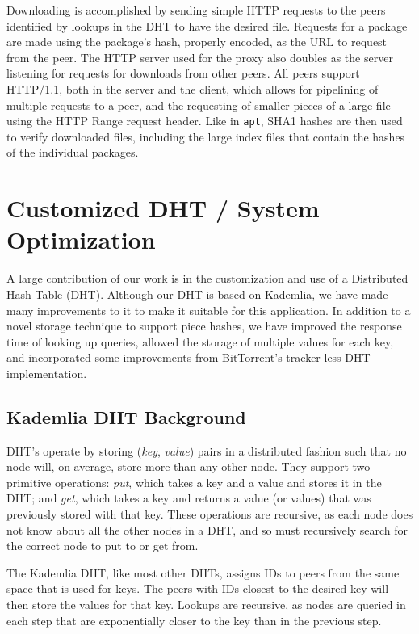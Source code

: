 \documentclass[conference]{IEEEtran}
\begin{document}
Downloading is accomplished by sending simple HTTP requests to the
peers identified by lookups in the DHT to have the desired file.
Requests for a package are made using the package's hash, properly
encoded, as the URL to request from the peer. The HTTP server used
for the proxy also doubles as the server listening for requests for
downloads from other peers. All peers support HTTP/1.1, both in the
server and the client, which allows for pipelining of multiple
requests to a peer, and the requesting of smaller pieces of a large
file using the HTTP Range request header. Like in \texttt{apt}, 
SHA1 hashes are then used to verify downloaded files, including the large
index files that contain the hashes of the individual packages. 


\section{Customized DHT / System Optimization}
\label{custom_dht}

A large contribution of our work is in the customization and use of
a Distributed Hash Table (DHT). Although our DHT is based on
Kademlia, we have made many improvements to it to make it suitable
for this application. In addition to a novel storage technique to
support piece hashes, we have improved the response time of looking
up queries, allowed the storage of multiple values for each key, and
incorporated some improvements from BitTorrent's tracker-less DHT
implementation.

\subsection{Kademlia DHT Background}
\label{dht}

DHT's operate by storing (\emph{key}, \emph{value}) pairs in a
distributed fashion such that no node will, on average, store more
than any other node. They support two primitive operations:
\emph{put}, which takes a key and a value and stores it in the DHT;
and \emph{get}, which takes a key and returns a value (or values)
that was previously stored with that key. These operations are
recursive, as each node does not know about all the other nodes in a
DHT, and so must recursively search for the correct node to put to
or get from.

The Kademlia DHT, like most other DHTs, assigns IDs to peers from
the same space that is used for keys. The peers with IDs closest to
the desired key will then store the values for that key. Lookups are
recursive, as nodes are queried in each step that are exponentially
closer to the key than in the previous step.
\end{document}
